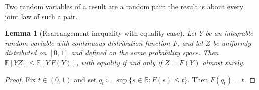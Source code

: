 \documentclass{article}
\newcommand{\E}{\mathbb{E}}
\newcommand{\R}{\mathbb{R}}
\newtheorem{lemma}[theorem]{Lemma}
\begin{document}
Two random variables of a result are a random pair: the result is about every joint law of such a pair.

\begin{lemma}[Rearrangement inequality with equality case]
\label{lem:rearrangement}
Let $Y$ be an integrable random variable with continuous distribution function $F$, and let $Z$ be uniformly distributed on $[0,1]$ and defined on the same probability space.
Then $\E[YZ]\le\E[Y\,F(Y)]$, with equality if and only if $Z=F(Y)$ almost surely.
\end{lemma}

\begin{proof}
Fix $t\in(0,1)$ and set $q_t\coloneqq\sup\{s\in\R:F(s)\le t\}$.
Then $F(q_t)=t$.
\end{proof}
\end{document}
